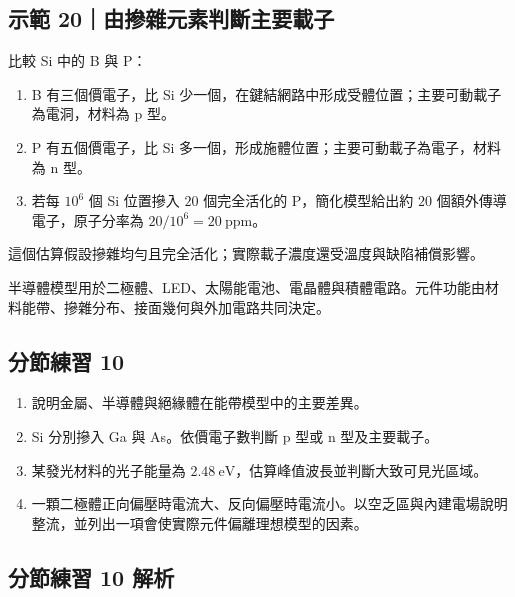 \documentclass[11pt,a4paper]{article}
\providecommand{\tightlist}{%
  \setlength{\itemsep}{0pt}\setlength{\parskip}{0pt}}
\begin{document}
\begin{HandoutWorkedExample}

\subsection{示範 20｜由摻雜元素判斷主要載子}\label{ux793aux7bc4-20ux7531ux647bux96dcux5143ux7d20ux5224ux65b7ux4e3bux8981ux8f09ux5b50}

比較 Si 中的 B 與 P：

\begin{enumerate}
\def\labelenumi{\arabic{enumi}.}
\tightlist
\item
  B 有三個價電子，比 Si 少一個，在鍵結網路中形成受體位置；主要可動載子為電洞，材料為 p 型。
\item
  P 有五個價電子，比 Si 多一個，形成施體位置；主要可動載子為電子，材料為 n 型。
\item
  若每 \(10^6\) 個 Si 位置摻入 \(20\) 個完全活化的 P，簡化模型給出約 \(20\) 個額外傳導電子，原子分率為 \(20/10^6=20\ \mathrm{ppm}\)。
\end{enumerate}

這個估算假設摻雜均勻且完全活化；實際載子濃度還受溫度與缺陷補償影響。

\end{HandoutWorkedExample}

半導體模型用於二極體、LED、太陽能電池、電晶體與積體電路。元件功能由材料能帶、摻雜分布、接面幾何與外加電路共同決定。

\subsection{分節練習 10}\label{ux5206ux7bc0ux7df4ux7fd2-10}

\begin{enumerate}
\def\labelenumi{\arabic{enumi}.}
\tightlist
\item
  說明金屬、半導體與絕緣體在能帶模型中的主要差異。
\item
  Si 分別摻入 Ga 與 As。依價電子數判斷 p 型或 n 型及主要載子。
\item
  某發光材料的光子能量為 \(2.48\ \mathrm{eV}\)，估算峰值波長並判斷大致可見光區域。
\item
  一顆二極體正向偏壓時電流大、反向偏壓時電流小。以空乏區與內建電場說明整流，並列出一項會使實際元件偏離理想模型的因素。
\end{enumerate}

\subsection{分節練習 10 解析}\label{ux5206ux7bc0ux7df4ux7fd2-10-ux89e3ux6790}
\end{document}

